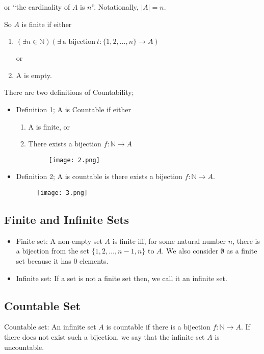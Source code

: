 \documentclass[12pt,a4paper,fleqn]{article}
\begin{document}
or ``the cardinality of \(A\) is \(n\)''. Notationally, \(|A|=n\).

So \(A\) is finite if either 
 \begin{enumerate}
  \item \(\left( \exists n \in \mathbb{N} \right) \left( \exists \ \text{a bijection} \ t: \{1,2,\ldots,n \} \to A \right)\)  
  
  or
  \item A is empty.
 \end{enumerate}

There are two definitions of Countability;
\begin{itemize}
  \item Definition 1;
  A is Countable if either 
  \begin{enumerate}
    \item A is finite, or
    \item There exists a bijection \(f: \mathbb{N} \to A\) 
     \begin{figure}[ht]
      \centering
      \texttt{[image: 2.png]}
      
      \label{Label}
  \end{figure} 
  \end{enumerate}
  \item Definition 2;
  A is countable is there exists a bijection \(f: \mathbb{N} \to A\).  
  \begin{figure}[ht]
    \centering
    \texttt{[image: 3.png]}
    
    \label{Label}
\end{figure} 
\end{itemize}

\pagebreak

 \subsection{Finite and Infinite Sets} 

 \begin{itemize}
  \item  Finite set: A non-empty set \(A\) is finite iff, for some natural number \(n\), there is a bijection from the set \( \{ 1,2, \ldots, n-1, n\} \) to \(A\). We also consider \(\emptyset \) as a finite set because it has 0 elements.
  \item Infinite set: If a set is not a finite set then, we call it an infinite set.
 \end{itemize}

  \subsection{Countable Set} 
  Countable set: An infinite set \(A\) is countable if there is a bijection \(f: \mathbb{N} \rightarrow A\). If there does not exist such a bijection, we say that the infinite set \(A\) is uncountable.
\end{document}
